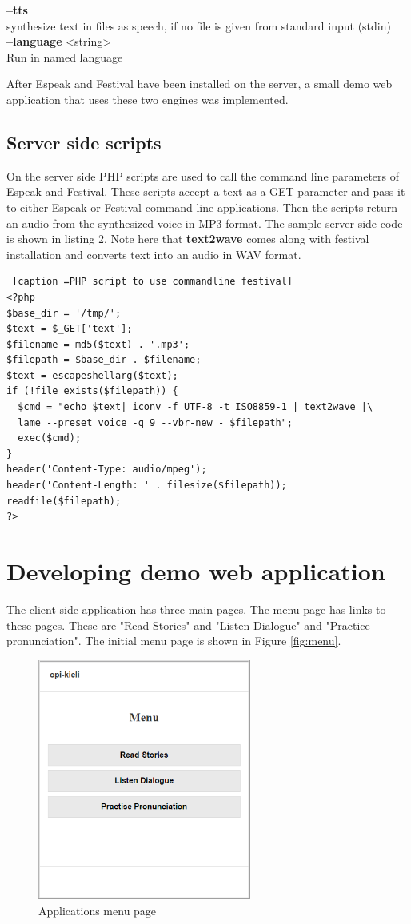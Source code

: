 \documentclass[11pt,a4paper,oneside,article]{memoir}
\begin{document}
\textbf{--tts}\\
synthesize text in files as speech, if no file is given from standard input (stdin)\\
\textbf{--language} <string>\\
Run in named language

After Espeak and Festival have been installed on the server, a small demo web application that uses these two engines was implemented. 

\subsection{Server side scripts}
On the server side PHP scripts are used to call the command line parameters of Espeak and Festival. These scripts accept a text as a GET parameter and pass it to either Espeak or Festival command line applications. Then the scripts return an audio from the synthesized voice in MP3 format. The sample server side code is shown in listing 2. Note here that \textbf{text2wave} comes along with festival installation and converts text into an audio in WAV format.

\lstset{language=php}
\begin{minipage}{\linewidth}
\begin{lstlisting} [caption =PHP script to use commandline festival]
<?php
$base_dir = '/tmp/';
$text = $_GET['text'];
$filename = md5($text) . '.mp3';
$filepath = $base_dir . $filename;
$text = escapeshellarg($text);
if (!file_exists($filepath)) {
  $cmd = "echo $text| iconv -f UTF-8 -t ISO8859-1 | text2wave |\
  lame --preset voice -q 9 --vbr-new - $filepath";
  exec($cmd);
}
header('Content-Type: audio/mpeg');
header('Content-Length: ' . filesize($filepath));
readfile($filepath);
?>
\end{lstlisting}
\end{minipage}
\section{Developing demo web application}
The client side application has three main pages. The menu page has links to these pages. These are "Read Stories" and "Listen Dialogue" and "Practice pronunciation". The initial menu page is shown in Figure  \vref{fig:menu}.
\begin{figure}[h]
\includegraphics[width=7cm]{menu}
\caption{Applications menu page}
\label{fig:menu}
\end{figure}
\end{document}
